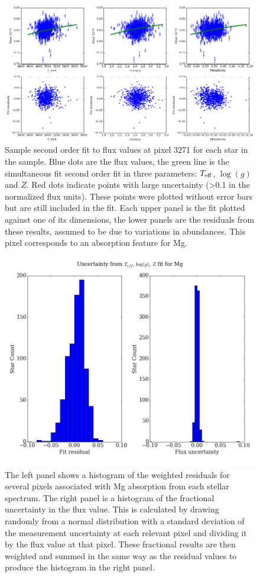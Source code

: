 \documentclass[preprint]{aastex}
\begin{document}


\begin{figure}[H]
\centering
\includegraphics[width = \linewidth]{pix3271fit.png}
\caption{Sample second order fit to flux values at pixel 3271 for each star in the sample. Blue dots are the flux values, the green line is the simultaneous fit second order fit in three parameters: $T_{\rm eff}$, $\log(g)$ and $Z$. Red dots indicate points with large uncertainty (>0.1 in the normalized flux units). These points were plotted without error bars but are still included in the fit. Each upper panel is the fit plotted against one of its dimensions, the lower panels are the residuals from these results, assumed to be due to variations in abundances. This pixel corresponds to an absorption feature for Mg.}
\label{fig:fit}
\end{figure}

\begin{figure}[H]
\centering
\includegraphics[width = \linewidth]{Mg_residuals.png}
\caption{The left panel shows a histogram of the weighted residuals for several pixels associated with Mg absorption from each stellar spectrum. The right panel is a histogram of the fractional uncertainty in the flux value. This is calculated by drawing randomly from a normal distribution with a standard deviation of the measurement uncertainty at each relevant pixel and dividing it by the flux value at that pixel. These fractional results are then weighted and summed in the same way as the residual values to produce the histogram in the right panel.}
\label{fig:resid}
\end{figure}
\end{document}
